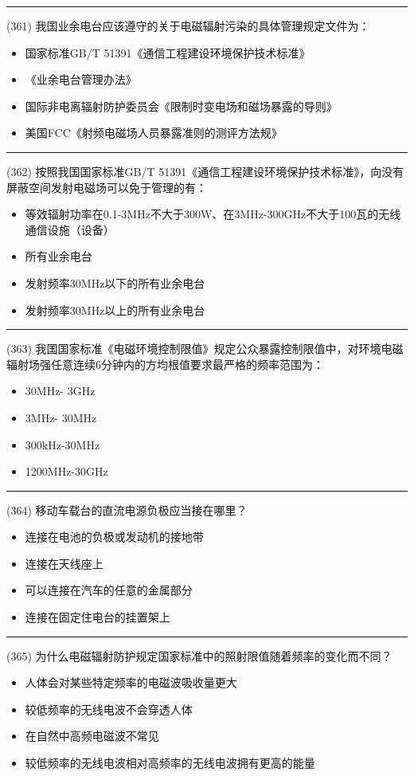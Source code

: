 \documentclass[twocolumn]{ctexart}  %
\begin{document}
\noindent\rule{0.5\textwidth}{1pt}
\heiti (361) 我国业余电台应该遵守的关于电磁辐射污染的具体管理规定文件为：  \songti {\color{gray} [LK1002] }
\begin{itemize}
	\item  国家标准GB/T 51391《通信工程建设环境保护技术标准》
	\item  《业余电台管理办法》
	\item  国际非电离辐射防护委员会《限制时变电场和磁场暴露的导则》
	\item  美国FCC《射频电磁场人员暴露准则的测评方法规》
\end{itemize}


\noindent\rule{0.5\textwidth}{1pt}
\heiti (362) 按照我国国家标准GB/T 51391《通信工程建设环境保护技术标准》，向没有屏蔽空间发射电磁场可以免于管理的有：  \songti {\color{gray} [LK1003] }
\begin{itemize}
	\item  等效辐射功率在0.1-3MHz不大于300W、在3MHz-300GHz不大于100瓦的无线通信设施（设备） 
	\item  所有业余电台
	\item  发射频率30MHz以下的所有业余电台
	\item  发射频率30MHz以上的所有业余电台
\end{itemize}


\noindent\rule{0.5\textwidth}{1pt}
\heiti (363) 我国国家标准《电磁环境控制限值》规定公众暴露控制限值中，对环境电磁辐射场强任意连续6分钟内的方均根值要求最严格的频率范围为：  \songti {\color{gray} [LK1009] }
\begin{itemize}
	\item  30MHz- 3GHz
	\item  3MHz- 30MHz
	\item  300kHz-30MHz
	\item  1200MHz-30GHz
\end{itemize}


\noindent\rule{0.5\textwidth}{1pt}
\heiti (364) 移动车载台的直流电源负极应当接在哪里？ \songti {\color{gray} [LK1128] }
\begin{itemize}
	\item  连接在电池的负极或发动机的接地带
	\item  连接在天线座上
	\item  可以连接在汽车的任意的金属部分
	\item  连接在固定住电台的挂置架上
\end{itemize}


\noindent\rule{0.5\textwidth}{1pt}
\heiti (365) 为什么电磁辐射防护规定国家标准中的照射限值随着频率的变化而不同？ \songti {\color{gray} [LK1236] }
\begin{itemize}
	\item  人体会对某些特定频率的电磁波吸收量更大
	\item  较低频率的无线电波不会穿透人体
	\item  在自然中高频电磁波不常见
	\item  较低频率的无线电波相对高频率的无线电波拥有更高的能量
\end{itemize}
\end{document}

